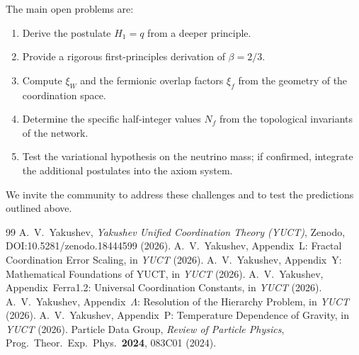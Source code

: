 \documentclass[12pt,a4paper]{article}
\begin{document}
	The main open problems are:
	\begin{enumerate}[label=(\roman*)]
		\item Derive the postulate \(H_1 = q\) from a deeper principle.
		\item Provide a rigorous first‑principles derivation of \(\beta = 2/3\).
		\item Compute \(\xi_W\) and the fermionic overlap factors \(\xi_f\) from the geometry of the coordination space.
		\item Determine the specific half‑integer values \(N_f\) from the topological invariants of the network.
		\item Test the variational hypothesis on the neutrino mass; if confirmed, integrate the additional postulates into the axiom system.
	\end{enumerate}
	We invite the community to address these challenges and to test the predictions outlined above.
	
	\begin{thebibliography}{99}
		 A.~V.~Yakushev, \emph{Yakushev Unified Coordination Theory (YUCT)}, Zenodo, DOI:10.5281/zenodo.18444599 (2026).
		 A.~V.~Yakushev, Appendix~L: Fractal Coordination Error Scaling, in \emph{YUCT} (2026).
		 A.~V.~Yakushev, Appendix~Y: Mathematical Foundations of YUCT, in \emph{YUCT} (2026).
		 A.~V.~Yakushev, Appendix~Ferra1.2: Universal Coordination Constants, in \emph{YUCT} (2026).
		 A.~V.~Yakushev, Appendix~\(\Lambda\): Resolution of the Hierarchy Problem, in \emph{YUCT} (2026).
		 A.~V.~Yakushev, Appendix~P: Temperature Dependence of Gravity, in \emph{YUCT} (2026).
		 Particle Data Group, \emph{Review of Particle Physics}, Prog.\ Theor.\ Exp.\ Phys.\ \textbf{2024}, 083C01 (2024).
	\end{thebibliography}
	
\end{document}
